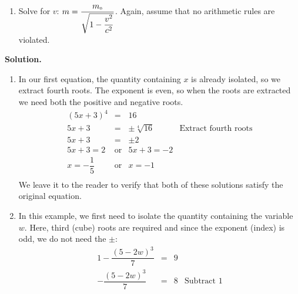 \documentclass{ximera}
\begin{document}
\begin{example}
\begin{multicols}{2}
\begin{enumerate}
\setcounter{HW}{\value{enumi}}
\end{enumerate}
\end{multicols}

\begin{enumerate}

\setcounter{enumi}{\value{HW}}

\item  Solve for $v$:  $m = \dfrac{m_{\text{\tiny$0$}}}{\sqrt{1 - \dfrac{v^2}{c^2}}}$.  Again, assume that no arithmetic rules are violated.

\setcounter{enumi}{\value{HW}}

\end{enumerate}


{\bf Solution.}

\begin{enumerate}

\item  In our first equation, the quantity containing $x$ is already isolated, so we extract fourth roots. The exponent is even, so when the roots are extracted we need both the positive and negative roots. \[ \begin{array}{rclr}

(5x +3)^{4} & = & 16 & \\ [2pt]

5x+3 & = & \pm \sqrt[4]{16} & \text{Extract fourth roots} \\ [2pt]

5x + 3 & = & \pm 2 & \\ [2pt]

5x+3 = 2 & \text{or} & 5x+3 = -2 & \\

x = -\dfrac{1}{5} & \text{or} & x = -1 \\ \end{array} \] We leave it to the reader to verify that both of these solutions satisfy the original equation.

\item  In this example, we first need to isolate the quantity containing the variable $w$.  Here, third (cube) roots are required and since the exponent (index) is odd, we do not need the $\pm$:\[ \begin{array}{rclr} 

1 - \dfrac{(5-2w)^3}{7} & = &  9 & \\ [8pt]


- \dfrac{(5-2w)^3}{7} & = & 8 & \text{Subtract $1$} \\[8pt]


\end{array}\]
\end{enumerate}
\end{example}
\end{document}
